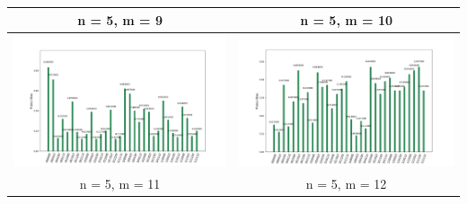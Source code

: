 \newpage
\begin{landscape}
\begin{table}[ht]
    \begin{tabular}{c c} 
        \hline
        n = 5, m = 9 & n = 5, m = 10 \\ \hline
        \includegraphics[scale=0.32]{Grover_results/Grover_n=5,m=9.png} & \includegraphics[scale=0.32]{Grover_results/Grover_n=5,m=10.png} \\ \hline
        n = 5, m = 11 & n = 5, m = 12 \\ \hline

\end{tabular}
\end{table}
\end{landscape}
